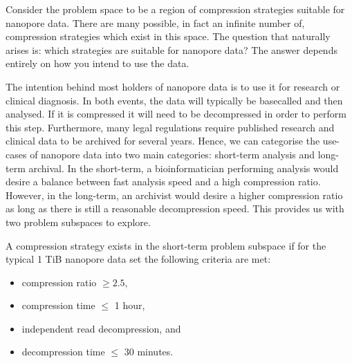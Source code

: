 

Consider the problem space to be a region of compression strategies suitable for nanopore data.
There are many possible, in fact an infinite number of, compression strategies which exist in this space.
The question that naturally arises is: which strategies are suitable for nanopore data?
The answer depends entirely on how you intend to use the data.

The intention behind most holders of nanopore data is to use it for research or clinical diagnosis. In both events, the data will typically be basecalled and then analysed. If it is compressed it will need to be decompressed in order to perform this step. Furthermore, many legal regulations require published research and clinical data to be archived for several years. Hence, we can categorise the use-cases of nanopore data into two main categories: short-term analysis and long-term archival. In the short-term, a bioinformatician performing analysis would desire a balance between fast analysis speed and a high compression ratio. However, in the long-term, an archivist would desire a higher compression ratio as long as there is still a reasonable decompression speed. This provides us with two problem subspaces to explore.

A compression strategy exists in the short-term problem subspace if for the typical 1 TiB nanopore data set the following criteria are met:
\begin{itemize}
\item compression ratio $\ge 2.5$,
\item compression time $\le$ 1 hour,
\item independent read decompression, and
\item decompression time $\le$ 30 minutes.
\end{itemize}

